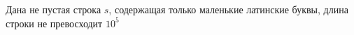 Дана не пустая строка $s$, содержащая только маленькие латинские буквы, длина строки не превосходит $10^5$ 